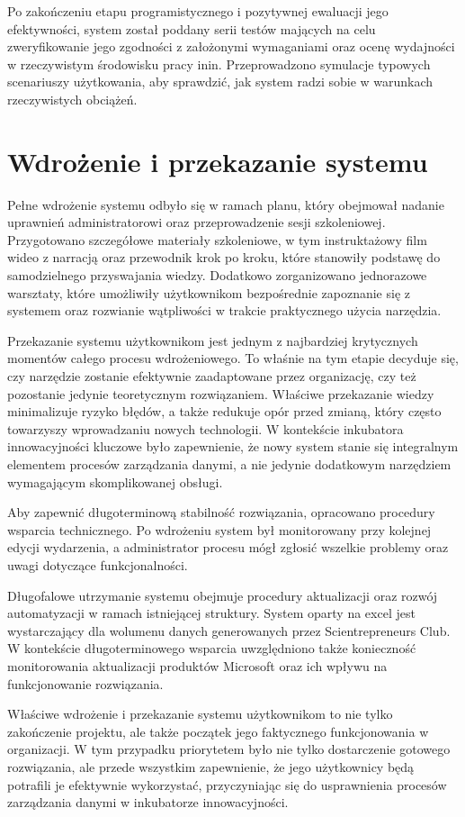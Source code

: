 Po zakończeniu etapu programistycznego i pozytywnej ewaluacji jego efektywności, system został poddany serii testów mających na celu zweryfikowanie jego zgodności z założonymi wymaganiami oraz ocenę wydajności w rzeczywistym środowisku pracy \gls{inin}. Przeprowadzono symulacje typowych scenariuszy użytkowania, aby sprawdzić, jak system radzi sobie w warunkach rzeczywistych obciążeń.

\section{Wdrożenie i przekazanie systemu}
Pełne wdrożenie systemu odbyło się w ramach  planu, który obejmował nadanie uprawnień administratorowi oraz przeprowadzenie sesji szkoleniowej. Przygotowano szczegółowe materiały szkoleniowe, w tym instruktażowy film wideo z narracją oraz przewodnik krok po kroku, które stanowiły podstawę do samodzielnego przyswajania wiedzy. Dodatkowo zorganizowano jednorazowe warsztaty, które umożliwiły użytkownikom bezpośrednie zapoznanie się z systemem oraz rozwianie wątpliwości w trakcie praktycznego użycia narzędzia.

Przekazanie systemu użytkownikom jest jednym z najbardziej krytycznych momentów całego procesu wdrożeniowego. To właśnie na tym etapie decyduje się, czy narzędzie zostanie efektywnie zaadaptowane przez organizację, czy też pozostanie jedynie teoretycznym rozwiązaniem. Właściwe przekazanie wiedzy minimalizuje ryzyko błędów, a także redukuje opór przed zmianą, który często towarzyszy wprowadzaniu nowych technologii. W kontekście inkubatora innowacyjności kluczowe było zapewnienie, że nowy system stanie się integralnym elementem procesów zarządzania danymi, a nie jedynie dodatkowym narzędziem wymagającym skomplikowanej obsługi.

Aby zapewnić długoterminową stabilność rozwiązania, opracowano procedury wsparcia technicznego. Po wdrożeniu system był monitorowany przy kolejnej edycji wydarzenia, a administrator procesu mógł zgłosić wszelkie problemy oraz uwagi dotyczące funkcjonalności. 

Długofalowe utrzymanie systemu obejmuje procedury aktualizacji oraz rozwój automatyzacji w ramach istniejącej struktury. System oparty na \gls{excel} jest wystarczający dla wolumenu danych generowanych przez Scientrepreneurs Club. W kontekście długoterminowego wsparcia uwzględniono także konieczność monitorowania aktualizacji produktów Microsoft oraz ich wpływu na funkcjonowanie rozwiązania.

Właściwe wdrożenie i przekazanie systemu użytkownikom to nie tylko zakończenie projektu, ale także początek jego faktycznego funkcjonowania w organizacji. W tym przypadku priorytetem było nie tylko dostarczenie gotowego rozwiązania, ale przede wszystkim zapewnienie, że jego użytkownicy będą potrafili je efektywnie wykorzystać, przyczyniając się do usprawnienia procesów zarządzania danymi w inkubatorze innowacyjności.


